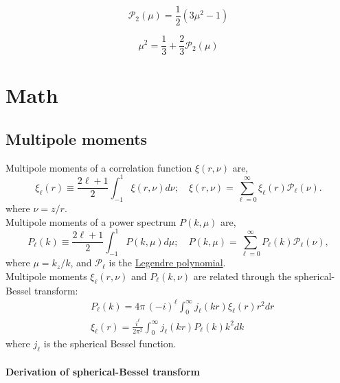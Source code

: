 \documentclass[a4paper,11pt, fleqn]{article}
\begin{document}
\clearpage
\begin{equation}
  \mathcal{P}_2(\mu) = \frac{1}{2}\left( 3 \mu^2 - 1 \right)
\end{equation}

\begin{equation}
  \mu^2 = \frac{1}{3} + \frac{2}{3} \mathcal{P}_2(\mu)
\end{equation}





\clearpage
\section{Math}

\subsection{Multipole moments}

Multipole moments of a correlation function $\xi(r,\nu)$ are,
\begin{equation}
  \xi_\ell(r) \equiv \frac{2 \ell + 1}{2} \int_{-1}^1 \xi(r, \nu) d\nu;\quad
  \xi(r, \nu) = \sum_{\ell=0}^\infty \xi_\ell(r) \mathcal{P}_\ell(\nu).
\end{equation}
where $\nu = z/r$.\\

Multipole moments of a power spectrum $P(k, \mu)$ are,
\begin{equation}
  P_\ell(k) \equiv \frac{2 \ell + 1}{2} \int_{-1}^1 P(k, \mu) d\mu;\quad
  P(k, \mu) = \sum_{\ell=0}^\infty P_\ell(k) \mathcal{P}_\ell(\nu),
\end{equation}
where $\mu = k_z/k$, and $\mathcal{P}_\ell$ is the \hyperref[sec:legendre]{Legendre polynomial}.\\

\vspace{5mm} Multipole moments $\xi_\ell(r, \nu)$ and $P_\ell(k, \nu)$
are related through the spherical-Bessel transform:
%
\begin{align}
  &P_\ell(k) = 4\pi \, (-i)^\ell \!\int_0^\infty \! j_\ell(kr) \xi_\ell(r) r^2 dr
  \label{eq:spherical-bessel-dr}\\
  &\xi_\ell(r) = \frac{i^\ell}{2\pi^2} \int_0^\infty \! j_\ell(kr) P_\ell(k) k^2 dk
  \label{eq:spherical-bessel-dk}
\end{align}
%
where $j_\ell$ is the spherical Bessel function.

\clearpage

\paragraph{Derivation of spherical-Bessel transform} \quad\\
\label{proof:multipole-transform}
\end{document}
